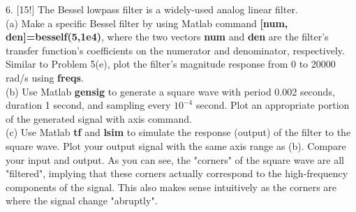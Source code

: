 \documentclass[12pt,a4paper]{article}
\begin{document}
\begin{tcolorbox}[colback = white]
6. [15!] The Bessel lowpass filter is a widely-used analog linear filter.\\
(a) Make a specific Bessel filter by using Matlab command  \textbf{[num, den]=besself(5,1e4)}, where the two vectors  \textbf{num} and  \textbf{den} are the filter's transfer function's coefficients on the numerator and denominator, respectively. Similar to Problem 5(e), plot the filter's magnitude response from 0 to 20000 rad/s using  \textbf{freqs}.\\
(b) Use Matlab  \textbf{gensig} to generate a square wave with period 0.002 seconds, duration 1 second, and sampling every $10^{-4}$ second. Plot an appropriate portion of the generated signal with axis command.\\
(c) Use Matlab  \textbf{tf} and \textbf{lsim} to simulate the response (output) of the filter to the square wave. Plot your output signal with the same axis range as (b). Compare your input and output. As you can see, the "corners" of the square wave are all "filtered", implying that these corners actually correspond to the high-frequency components of the signal. This also makes sense intuitively as the corners are where the signal change "abruptly".
\end{tcolorbox}
\end{document}
